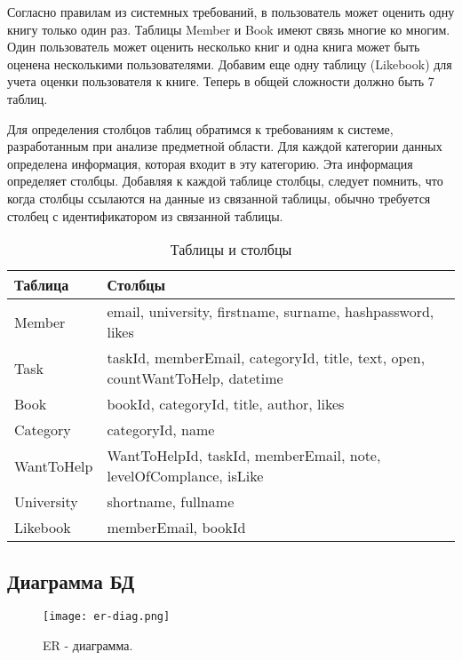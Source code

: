 Согласно правилам из системных требований, в пользователь может оценить одну книгу только один раз. Таблицы Member и Book имеют связь многие ко многим. Один пользователь может оценить несколько книг и одна книга может быть оценена несколькими пользователями. Добавим еще одну таблицу (Likebook) для учета оценки пользователя к книге. Теперь в общей сложности должно быть 7 таблиц. 

Для определения столбцов таблиц обратимся к требованиям к системе, разработанным при анализе предметной области. Для каждой категории данных определена информация, которая входит в эту категорию. Эта информация определяет столбцы. Добавляя к каждой таблице столбцы, следует помнить, что когда столбцы ссылаются на данные из связанной таблицы, обычно требуется столбец с идентификатором из связанной таблицы.

\begin{table}[h]
\caption{Таблицы и столбцы}
\medskip
\begin{tabular}{|l|p{12cm}|}
\hline
Таблица & Столбцы\\
\hline
Member & email, university, firstname, surname, hashpassword, likes\\
Task & taskId, memberEmail, categoryId, title, text, open, countWantToHelp, datetime\\
Book & bookId, categoryId, title, author, likes\\
Category & categoryId, name\\
WantToHelp & WantToHelpId, taskId, memberEmail, note, levelOfComplance, isLike\\
University & shortname, fullname\\
Likebook & memberEmail, bookId\\
\hline
\end{tabular}
\end{table}

\subsection{Диаграмма БД}
\begin{figure}[h]
  \centering
  \texttt{[image: er-diag.png]}
  \caption{ER - диаграмма.}
\end{figure}



% 
% 
